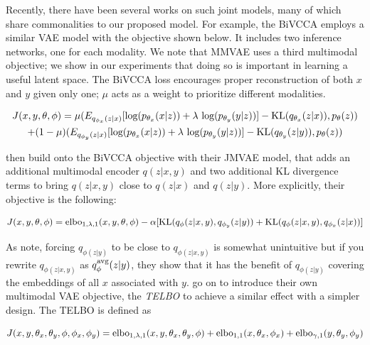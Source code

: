 \documentclass{article}
\begin{document}
Recently, there have been several works on such joint models, many of which share commonalities to our proposed model. For example, the BiVCCA employs a similar VAE model with the objective shown below. It includes two inference networks, one for each modality. We note that MMVAE uses a third multimodal objective; we show in our experiments that doing so is important in learning a useful latent space. The BiVCCA loss encourages proper reconstruction of both $x$ and $y$ given only one; $\mu$ acts as a weight to prioritize different modalities. 

\begin{multline}
    J(x, y, \theta, \phi) = \mu (E_{q_{\phi_{x}}(z|x)}[\textup{log}(p_{\theta_{x}}(x|z)) + \lambda \textup{ log}(p_{\theta_{y}}(y|z))] - \textup{KL}(q_{\theta_{x}}(z|x)), p_{\theta}(z)) \\ + (1 - \mu) (E_{q_{\phi_{y}}(z|x)}[\textup{log}(p_{\theta_{x}}(x|z)) + \lambda \textup{ log}(p_{\theta_{y}}(y|z))] - \textup{KL}(q_{\theta_{y}}(z|y)), p_{\theta}(z))
\end{multline}

\citet{suzuki2016joint} then build onto the BiVCCA objective with their JMVAE model, that adds an additional multimodal encoder $q(z|x,y)$ and two additional KL divergence terms to bring $q(z|x,y)$ close to $q(z|x)$ and $q(z|y)$. More explicitly, their objective is the following:

\begin{equation}
    J(x, y, \theta, \phi) = \textup{elbo}_{1, \lambda, 1}(x, y, \theta, \phi) - \alpha[\textup{KL}(q_{\phi}(z|x,y), q_{\phi_{y}}(z|y)) + \textup{KL}(q_{\phi}(z|x,y), q_{\phi_{x}}(z|x))]
\end{equation}

As \citet{vedantam2017generative} note, forcing $q_{\phi(z|y)}$ to be close to $q_{\phi(z|x, y)}$ is somewhat unintuitive but if you rewrite $q_{\phi(z|x, y)}$ as $q_{\phi}^{\textup{avg}}(z|y)$, they show that it has the benefit of $q_{\phi(z|y)}$ covering the embeddings of all $x$ associated with $y$. \citet{vedantam2017generative} go on to introduce their own multimodal VAE objective, the \textit{TELBO} to achieve a similar effect with a simpler design. The TELBO is defined as

\begin{equation}
    J(x, y, \theta_{x}, \theta_{y}, \phi, \phi_{x}, \phi_{y}) = \textup{elbo}_{1, \lambda, 1}(x, y, \theta_{x}, \theta_{y}, \phi) + \textup{elbo}_{1, 1}(x, \theta_{x}, \phi_{x}) + \textup{elbo}_{\gamma, 1}(y, \theta_{y}, \phi_{y})
\end{equation}
\end{document}
